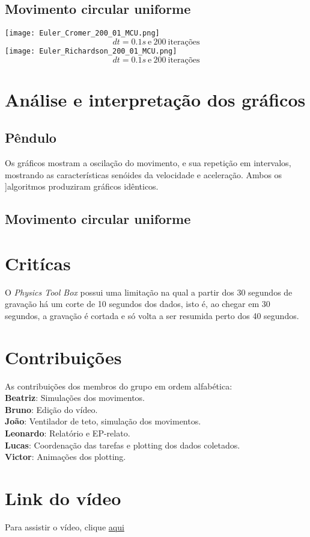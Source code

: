 \documentclass[a4paper, 12pt]{article}
\begin{document}
\subsection*{Movimento circular uniforme}
\texttt{[image: Euler\_Cromer\_200\_01\_MCU.png]} \\
$$dt=0.1s\ \text{e}\ 200\ \text{iterações}$$
\texttt{[image: Euler\_Richardson\_200\_01\_MCU.png]} \\
$$dt=0.1s\ \text{e}\ 200\ \text{iterações}$$


\section*{Análise e interpretação dos gráficos}
\subsection*{Pêndulo}
Os gráficos mostram a oscilação do movimento, e sua repetição em intervalos, 
mostrando as características senóides da velocidade e aceleração. Ambos os 
]algoritmos produziram gráficos idênticos.

\subsection*{Movimento circular uniforme}


\section*{Critícas}
O \textit{Physics Tool Box} possui uma limitação na qual a partir dos 30 
segundos de gravação há um corte de 10 segundos dos dados, isto é, ao chegar
em 30 segundos, a gravação é cortada e só volta a ser resumida perto dos 40
segundos.

\section*{Contribuições}
As contribuições dos membros do grupo em ordem alfabética: \\
\textbf{Beatriz}: Simulações dos movimentos. \\
\textbf{Bruno}: Edição do vídeo.\\
\textbf{João}: Ventilador de teto, simulação dos movimentos.\\
\textbf{Leonardo}: Relatório e EP-relato.\\
\textbf{Lucas}: Coordenação das tarefas e plotting dos dados coletados.\\
\textbf{Victor}: Animações dos plotting.\\

\section*{Link do vídeo}
Para assistir o vídeo, clique
\href{https://youtu.be/roxjSn8T0NI}{aqui}
\end{document}
